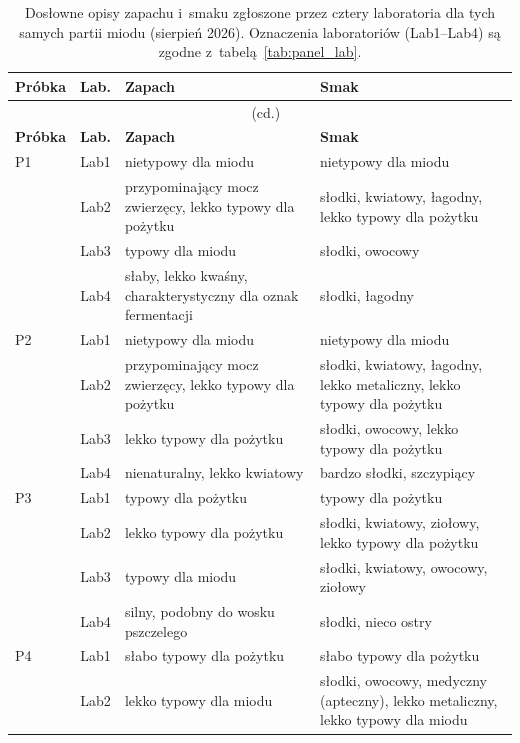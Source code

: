 {\small
\begin{longtable}{@{}lc>{\raggedright\arraybackslash}p{5.2cm}>{\raggedright\arraybackslash}p{5.6cm}@{}}
\caption{Dosłowne opisy zapachu i~smaku zgłoszone przez cztery laboratoria
dla tych samych partii miodu (sierpień 2026). Oznaczenia
laboratoriów (Lab1--Lab4) są zgodne z~tabelą~\ref{tab:panel_lab}.\label{tab:interlab_opisy}}\\
\toprule
\textbf{Próbka} & \textbf{Lab.} & \textbf{Zapach} & \textbf{Smak} \\
\midrule
\endfirsthead
\multicolumn{4}{c}{\tablename\ \thetable{} (cd.)}\\
\toprule
\textbf{Próbka} & \textbf{Lab.} & \textbf{Zapach} & \textbf{Smak} \\
\midrule
\endhead
\bottomrule
\endfoot
P1
 & Lab1 & nietypowy dla miodu & nietypowy dla miodu \\
 & Lab2 & przypominający mocz zwierzęcy, lekko typowy dla pożytku & słodki, kwiatowy, łagodny, lekko typowy dla pożytku \\
 & Lab3 & typowy dla miodu & słodki, owocowy \\
 & Lab4 & słaby, lekko kwaśny, charakterystyczny dla oznak fermentacji & słodki, łagodny \\
\midrule
P2
 & Lab1 & nietypowy dla miodu & nietypowy dla miodu \\
 & Lab2 & przypominający mocz zwierzęcy, lekko typowy dla pożytku & słodki, kwiatowy, łagodny, lekko metaliczny, lekko typowy dla pożytku \\
 & Lab3 & lekko typowy dla pożytku & słodki, owocowy, lekko typowy dla pożytku \\
 & Lab4 & nienaturalny, lekko kwiatowy & bardzo słodki, szczypiący \\
\midrule
P3
 & Lab1 & typowy dla pożytku & typowy dla pożytku \\
 & Lab2 & lekko typowy dla pożytku & słodki, kwiatowy, ziołowy, lekko typowy dla pożytku \\
 & Lab3 & typowy dla miodu & słodki, kwiatowy, owocowy, ziołowy \\
 & Lab4 & silny, podobny do wosku pszczelego & słodki, nieco ostry \\
\midrule
P4
 & Lab1 & słabo typowy dla pożytku & słabo typowy dla pożytku \\
 & Lab2 & lekko typowy dla miodu & słodki, owocowy, medyczny (apteczny), lekko metaliczny, lekko typowy dla miodu \\

\end{longtable}}
